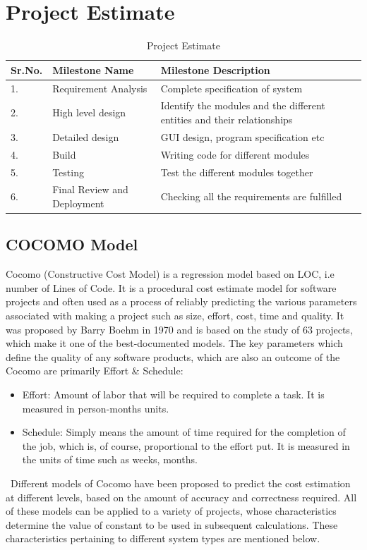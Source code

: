 \documentclass[oneside,a4paper,12pt]{report}
\begin{document}
\section{Project Estimate}
{\renewcommand{\arraystretch}{2}%
	\begin{table}[!htbp]
   
				\begin{tabular}{ |p{1cm}|p{4cm}|p{6cm}|  }
 \hline
 Sr.No. & Milestone Name & Milestone Description\\ 
 \hline
 1. & Requirement Analysis & Complete specification of system \\ 
 \hline
2. & High level design & Identify the modules and the different  entities and their relationships\\
 \hline
 3. & Detailed design & GUI design, program specification etc \\ 
 \hline
4. & Build & Writing code for different modules\\
\hline
5.	& Testing  & Test the different modules together  \\
\hline
6. & Final Review and Deployment & Checking all the requirements are fulfilled \\
\hline
\end{tabular}
\caption{Project Estimate}
	\label{tab:hreq}
\end{table}

\newpage
\subsection{COCOMO Model}
Cocomo (Constructive Cost Model) is a regression model based on LOC, i.e number of Lines of Code. It is a procedural cost estimate model for software projects and often used as a process of reliably predicting the various parameters associated with making a project such as size, effort, cost, time and quality. It was proposed by Barry Boehm in 1970 and is based on the study of 63 projects, which make it one of the best-documented models. The key parameters which define the quality of any software products, which are also an outcome of the Cocomo are primarily Effort \& Schedule:
\begin{itemize}
\item Effort: Amount of labor that will be required to complete a task. It is measured in person-months units.\
\item Schedule: Simply means the amount of time required for the completion of the job, which is, of course, proportional to the effort put. It is measured in the units of time such as weeks, months.\\
\end{itemize}
\
Different models of Cocomo have been proposed to predict the cost estimation at different levels, based on the amount of accuracy and correctness required. All of these models can be applied to a variety of projects, whose characteristics determine the value of constant to be used in subsequent calculations. These characteristics pertaining to different system types are mentioned below.\\

}
\end{document}
